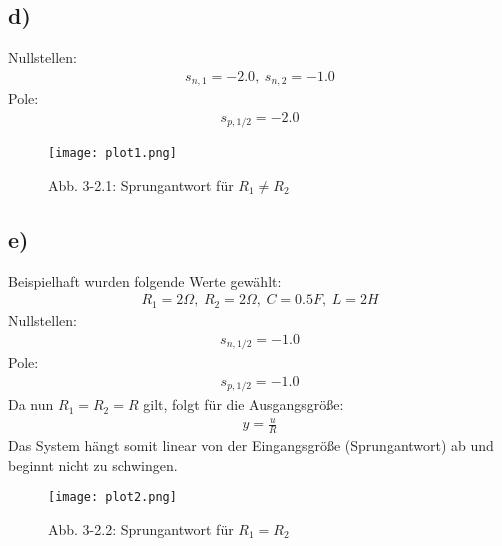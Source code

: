 \documentclass[11pt]{scrartcl} %
\begin{document}
\subsection*{d)}
Nullstellen:
\begin{align*}
	s_{n,1}=-2.0,\hspace{3pt}s_{n,2}=-1.0
\end{align*}
Pole:
\begin{align*}
	s_{p,1/2}=-2.0
\end{align*}
\begin{figure}[H]
	\centering
	\texttt{[image: plot1.png]}
	\captionsetup{labelformat=empty}
	\caption{Abb. 3-2.1: Sprungantwort für $R_1\neq R_2$}
\end{figure}
\subsection*{e)}
Beispielhaft wurden folgende Werte gewählt:
\begin{align*}
	R_1=2\Omega,\hspace{3pt}R_2=2\Omega,\hspace{3pt}C=0.5F,\hspace{3pt}L=2H
\end{align*}
Nullstellen:
\begin{align*}
	s_{n,1/2}=-1.0
\end{align*}
Pole:
\begin{align*}
	s_{p,1/2}=-1.0
\end{align*}
Da nun  $R_1=R_2=R$ gilt, folgt für die Ausgangsgröße:
\begin{align*}
	y=\frac{u}{R}
\end{align*}
Das System hängt somit linear von der Eingangsgröße (Sprungantwort) ab und beginnt nicht zu schwingen. 
\begin{figure}[H]
	\centering
	\texttt{[image: plot2.png]}
	\captionsetup{labelformat=empty}
	\caption{Abb. 3-2.2: Sprungantwort für $R_1=R_2$}
\end{figure}
\end{document}

